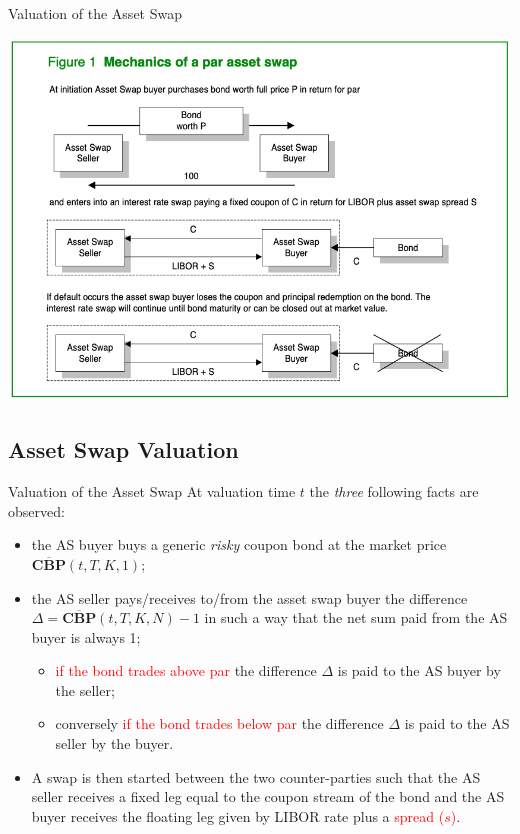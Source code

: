 \documentclass{beamer}
\begin{document}
\begin{frame}{Valuation of the Asset Swap}
	\begin{center}
		\includegraphics[width=0.7\linewidth]{asset_swap}
	\end{center}
\end{frame}

\subsection{Asset Swap Valuation}
\begin{frame}{Valuation of the Asset Swap}
	At valuation time $t$ the \emph{three} following facts are observed:
	\begin{itemize}
		\item<2-> the AS buyer buys a generic \emph{risky} coupon bond at the market price $\overline{\textbf{CBP}}(t,T,K,1)$;
		\item<3-> the AS seller pays/receives to/from the asset swap buyer the difference $\Delta = \overline{\textbf{CBP}}(t,T,K,N)-1$ in such a way that the net sum paid from the AS buyer is always 1; 
		\begin{itemize}
			\item \textcolor{red}{if the bond trades above par} the difference $\Delta$ is paid to the AS buyer by the seller;
			\item conversely \textcolor{red}{if the bond trades below par} the difference $\Delta$ is paid to the AS seller by the buyer.
		\end{itemize}
		\item<4-> A swap is then started between the two counter-parties such that the AS seller receives a fixed leg equal to the coupon stream of the bond and the AS buyer receives the floating leg given by LIBOR rate plus a \textcolor{red}{spread ($s$)}.
	\end{itemize}
\end{frame}
\end{document}
